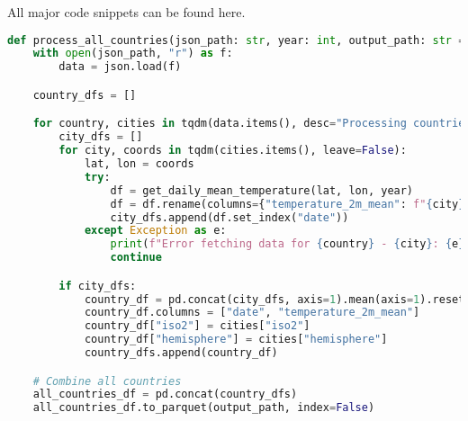 All major code snippets can be found here.

\begin{lstlisting}[language=Python, caption={Method to retrieve historical temperature data}]
    def process_all_countries(json_path: str, year: int, output_path: str = "country_daily_avg.parquet"):
    with open(json_path, "r") as f:
        data = json.load(f)

    country_dfs = []

    for country, cities in tqdm(data.items(), desc="Processing countries"):
        city_dfs = []
        for city, coords in tqdm(cities.items(), leave=False):
            lat, lon = coords
            try:
                df = get_daily_mean_temperature(lat, lon, year)
                df = df.rename(columns={"temperature_2m_mean": f"{city}"})
                city_dfs.append(df.set_index("date"))
            except Exception as e:
                print(f"Error fetching data for {country} - {city}: {e}")
                continue

        if city_dfs:
            country_df = pd.concat(city_dfs, axis=1).mean(axis=1).reset_index()
            country_df.columns = ["date", "temperature_2m_mean"]
            country_df["iso2"] = cities["iso2"]
            country_df["hemisphere"] = cities["hemisphere"]
            country_dfs.append(country_df)

    # Combine all countries
    all_countries_df = pd.concat(country_dfs)
    all_countries_df.to_parquet(output_path, index=False)    
\end{lstlisting}\label{code:season}